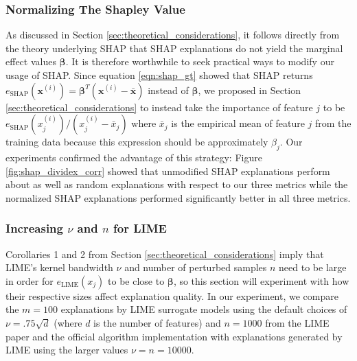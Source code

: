 \documentclass[mnsc,blindrev]{informs3}
\begin{document}
            \subsubsection{Normalizing The Shapley Value}
                As discussed in Section \ref{sec:theoretical_considerations}, it follows directly from the theory underlying SHAP that SHAP explanations do not yield the marginal effect values $\boldsymbol{\beta}$. It is therefore worthwhile to seek practical ways to modify our usage of SHAP. Since equation \ref{eqn:shap_gt} showed that SHAP returns $e_{\text{SHAP}}(\mathbf{x}^{(i)})=\boldsymbol{\beta}^T(\mathbf{x}^{(i)} - \bar{\mathbf{x}})$ instead of $\boldsymbol{\beta}$, we proposed in Section \ref{sec:theoretical_considerations} to instead take the importance of feature $j$ to be $e_{\text{SHAP}}(x^{(i)}_j) / (x^{(i)}_j - \bar{x}_j)$ where $\bar{x}_j$ is the empirical mean of feature $j$ from the training data because this expression should be approximately $\beta_j$. Our experiments confirmed the advantage of this strategy: Figure \ref{fig:shap_dividex_corr} showed that unmodified SHAP explanations perform about as well as random explanations with respect to our three metrics while the normalized SHAP explanations performed significantly better in all three metrics.



        
        \subsubsection{Increasing $\nu$ and $n$ for LIME } 
            \label{sec:lime_params}
            Corollaries 1 and 2 from Section \ref{sec:theoretical_considerations} imply that LIME's kernel bandwidth $\nu$ and number of perturbed samples $n$ need to be large in order for $e_{\text{LIME}}(x_j)$ to be close to $\boldsymbol{\beta}$, so this section will experiment with how their respective sizes affect explanation quality. In our experiment, we compare the  $m=100$ explanations by LIME surrogate models using the default choices of $\nu = .75\sqrt{d}$ (where $d$ is the number of features) and $n=1000$ from the LIME paper and the official algorithm implementation with explanations generated by LIME  using the larger values $\nu=n=10000$. 
            
\end{document}
